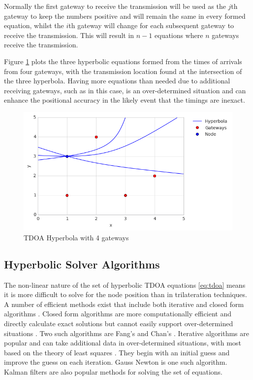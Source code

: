 \documentclass[a4paper]{report}
\begin{document}
      Normally the first gateway to receive the transmission will be used as the \(j\)th gateway to keep the numbers positive and will remain the same in every formed equation, whilst the \(i\)th gateway will change for each subsequent gateway to receive the transmission. This will result in \(n-1\) equations where \(n\) gateways receive the transmission.

      Figure \ref{fig:tdoa} plots the three hyperbolic equations formed from the times of arrivals from four gateways, with the transmission location found at the intersection of the three hyperbola. Having more equations than needed due to additional receiving gateways, such as in this case, is an over-determined situation and can enhance the positional accuracy in the likely event that the timings are inexact.

      \begin{figure}[ht]
      \centering
      \includegraphics[width=12cm]{figures/TDOA.png}
      \caption{TDOA Hyperbola with 4 gateways}
      \label{fig:tdoa}
      \end{figure}

    \subsection{Hyperbolic Solver Algorithms}
      The non-linear nature of the set of hyperbolic TDOA equations \ref{eq:tdoa} means it is more difficult to solve for the node position than in trilateration techniques. A number of efficient methods exist that include both iterative and closed form algorithms \cite{ElGemayel2013}. Closed form algorithms are more computationally efficient and directly calculate exact solutions but cannot easily support over-determined situations \cite{Li2011}. Two such algorithms are Fang's \cite{Aatique1997} and Chan's \cite{Chan1994}. Iterative algorithms are popular and can take additional data in over-determined situations, with most based on the theory of least squares \cite{Koks2007}. They begin with an initial guess and improve the guess on each iteration. Gauss Newton is one such algorithm. Kalman filters are also popular methods for solving the set of equations.
\end{document}
